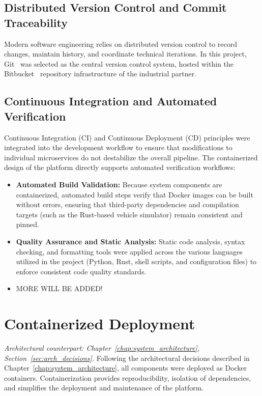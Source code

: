 \subsection{Distributed Version Control and Commit Traceability}
Modern software engineering relies on distributed version control to record changes, maintain history, and coordinate technical iterations. In this project, Git~\cite{git} was selected as the central version control system, hosted within the Bitbucket~\cite{bitbucket} repository infrastructure of the industrial partner.

\subsection{Continuous Integration and Automated Verification}
Continuous Integration (CI) and Continuous Deployment (CD) principles were integrated into the development workflow to ensure that modifications to individual microservices do not destabilize the overall pipeline. The containerized design of the platform directly supports automated verification workflows:
\begin{itemize}
    \item \textbf{Automated Build Validation:} Because system components are containerized, automated build steps verify that Docker images can be built without errors, ensuring that third-party dependencies and compilation targets (such as the Rust-based vehicle simulator) remain consistent and pinned.
    \item \textbf{Quality Assurance and Static Analysis:} Static code analysis, syntax checking, and formatting tools were applied across the various languages utilized in the project (Python, Rust, shell scripts, and configuration files) to enforce consistent code quality standards.
    \item MORE WILL BE ADDED!
\end{itemize}

\section{Containerized Deployment}
\label{sec:containerized_deployment}
\textit{Architectural counterpart: Chapter~\ref{chap:system_architecture}, Section~\ref{sec:arch_decisions}.}
Following the architectural decisions described in Chapter~\ref{chap:system_architecture}, all components were deployed as Docker containers. Containerization provides reproducibility, isolation of dependencies, and simplifies the deployment and maintenance of the platform. 

